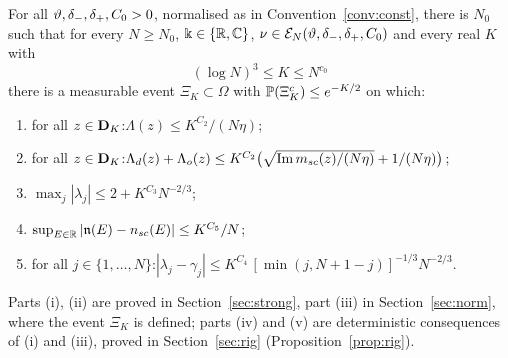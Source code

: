 \begin{theorem}\label{thm:K}
For all $\vartheta,\delta_-,\delta_+,C_0>0$, normalised as in Convention~\ref{conv:const}, there is $N_0$ such that for every $N\ge N_0$, $\Bbbk\in\{\mathbb{R},\mathbb{C}\}$,
$\nu\in\mathcal E_N(\vartheta,\delta_-,\delta_+,C_0)$ and every real $K$ with
\begin{equation}\label{eq:Krange}
 (\log N)^3\le K\le N^{c_0}
\end{equation}
there is a measurable event $\Xi_K\subset\Omega$ with $\mathbb{P}(\Xi_K^c)\le e^{-K/2}$ on which:
\begin{enumerate}[label=\textup{(\roman*)},leftmargin=2.2em,itemsep=1pt]
\item for all $z\in\mathbf{D}_K$:\quad $\Lambda(z)\le K^{C_2}/(N\eta)$;
\item for all $z\in\mathbf{D}_K$:\quad $\Lambda_d(z)+\Lambda_o(z)\le K^{C_2}\big(\sqrt{\operatorname{Im}m_{sc}(z)/(N\eta)}+1/(N\eta)\big)$;
\item $\max_j|\lambda_j|\le2+K^{C_3}N^{-2/3}$;
\item $\sup_{E\in\mathbb{R}}|\mathfrak{n}(E)-n_{sc}(E)|\le K^{C_5}/N$;
\item for all $j\in\{1,\dots,N\}$:\quad $|\lambda_j-\gamma_j|\le K^{C_4}\,[\min(j,N+1-j)]^{-1/3}N^{-2/3}$.
\end{enumerate}
\end{theorem}
\noindent Parts (i), (ii) are proved in Section~\ref{sec:strong}, part (iii) in Section~\ref{sec:norm}, where the event $\Xi_K$ is defined; parts (iv) and (v) are deterministic consequences of (i) and (iii),
proved in Section~\ref{sec:rig} (Proposition~\ref{prop:rig}).


